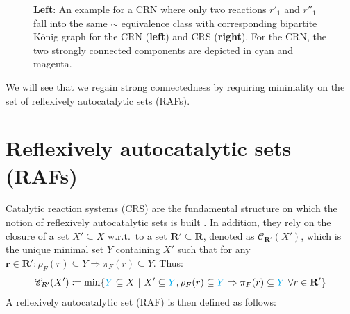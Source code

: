 \documentclass[pdflatex]{sn-jnl}
\theoremstyle{thmstyleone}%
\theoremstyle{examplesty}%
\theoremstyle{thmstylethree}%
\newcommand{\closure}[2]{\mathscr{C}_{#1}(#2)}
\newcommand{\FR}[0]{\mathbf{R}}
\newcommand{\fr}[0]{\mathbf{r}}
\newcommand{\RAF}[0]{\mathbf{R}'}
\newcommand{\feducts}{\rho_F}
\newcommand{\fproducts}{\pi_F}
\newcommand{\PFS}[1]{\begingroup\color{cyan}#1\endgroup}
\newcommand{\holy}[1]{\begingroup\color{royalpurple}#1\endgroup}
\begin{document}
\begin{figure}[htb]
\begin{minipage}[c]{0.5\textwidth}
  \end{minipage}
  \caption{\textbf{Left}: An example for a CRN where only two reactions
    $r'_1$ and $r''_1$ fall into the same $\sim$ equivalence class with
    corresponding bipartite K\"onig graph for the CRN (\textbf{left}) and
    CRS (\textbf{right}). For the CRN, the two strongly connected
    components are depicted in cyan and magenta.}
  \label{fig:QScKNot}
\end{figure}
\FloatBarrier

We will see that we regain \holy{strong connectedness} by requiring minimality 
on the set of reflexively autocatalytic sets (RAFs).

\section{Reflexively autocatalytic sets (RAFs)}

Catalytic reaction systems (CRS) are the fundamental structure on which the
notion of reflexively autocatalytic sets is built
\cite{steel_emergence_2000, hordijk_detecting_2004}. In addition, they rely
on the closure of a set $X' \subseteq X$ w.r.t.\ to a set $\RAF \subseteq
\FR$, denoted as $\closure{\RAF}{X'}$, which is the unique minimal set $Y$
containing $X'$ such that for any $\fr\in \RAF: \feducts(r)\subseteq Y
\Rightarrow \fproducts(r)\subseteq Y$. Thus:
\begin{equation}\label{eq:Closure}
  \closure{R'}{X'} \coloneqq \min \{\PFS{Y} \subseteq X \ | \ X'\subseteq \PFS{Y},
  \feducts(r) \subseteq \PFS{Y} \Rightarrow \fproducts(r) \subseteq \PFS{Y} \ \forall
  r\in \RAF\}
\end{equation}
A reflexively autocatalytic set (RAF) is then defined as follows:
\end{document}

